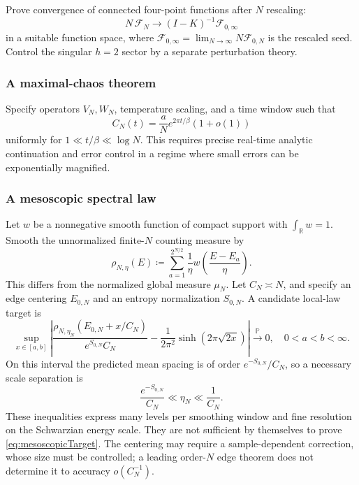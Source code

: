 \documentclass[11pt]{article}
\numberwithin{equation}{section}
\theoremstyle{exposition}
\theoremstyle{result}
\newcommand{\Pp}{\mathbb P}
\newcommand{\R}{\mathbb R}
\newcommand{\cF}{\mathcal F}
\begin{document}
Prove convergence of connected four-point functions after $N$ rescaling:
\begin{equation*}
N\,\cF_N\longrightarrow (I-K)^{-1}\cF_{0,\infty}
\end{equation*}
in a suitable function space, where $\cF_{0,\infty}=\lim_{N\to\infty}N\cF_{0,N}$ is the rescaled seed. Control the singular $h=2$ sector by a separate perturbation theory.

\subsubsection{A maximal-chaos theorem}

Specify operators $V_N,W_N$, temperature scaling, and a time window such that
\begin{equation*}
C_N(t)=\frac{a}{N}e^{2\pi t/\beta}(1+o(1))
\end{equation*}
uniformly for $1\ll t/\beta\ll \log N$. This requires precise real-time analytic continuation and error control in a regime where small errors can be exponentially magnified.

\subsubsection{A mesoscopic spectral law}
Let $w$ be a nonnegative smooth function of compact support with $\int_\R w=1$. Smooth the unnormalized finite-$N$ counting measure by
\begin{equation*}
\rho_{N,\eta}(E)\coloneqq \sum_{a=1}^{2^{N/2}}
\frac1\eta w\left(\frac{E-E_a}{\eta}\right).
\end{equation*}
This differs from the normalized global measure $\mu_N$. Let $C_N\asymp N$, and specify an edge centering $E_{0,N}$ and an entropy normalization $S_{0,N}$. A candidate local-law target is
\begin{equation}
\sup_{x\in[a,b]}
\left|\frac{\rho_{N,\eta_N}(E_{0,N}+x/C_N)}{e^{S_{0,N}}C_N}
-\frac1{2\pi^2}\sinh(2\pi\sqrt{2x})\right|
\xrightarrow{\Pp}0,
\quad 0<a<b<\infty.
\label{eq:mesoscopicTarget}
\end{equation}
On this interval the predicted mean spacing is of order $e^{-S_{0,N}}/C_N$, so a necessary scale separation is
\begin{equation*}
\frac{e^{-S_{0,N}}}{C_N}\ll\eta_N\ll\frac1{C_N}.
\end{equation*}
These inequalities express many levels per smoothing window and fine resolution on the Schwarzian energy scale. They are not sufficient by themselves to prove \eqref{eq:mesoscopicTarget}. The centering may require a sample-dependent correction, whose size must be controlled; a leading order-$N$ edge theorem does not determine it to accuracy $o(C_N^{-1})$.
\end{document}

